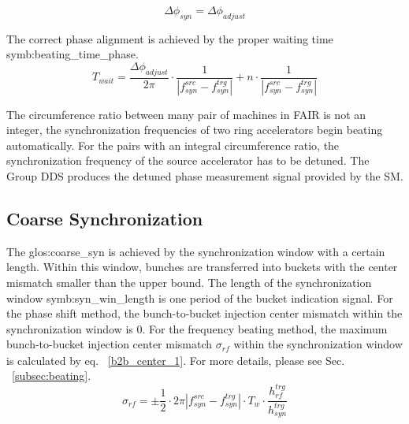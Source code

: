\begin{equation}
\Delta \phi_\mathit{syn}=\Delta \phi_\mathit{adjust} 
\end{equation}

The correct phase alignment is achieved by the proper waiting time \gls{symb:beating_time_phase}.
\begin{equation}
T_\mathit{wait}= \frac{\Delta \phi_\mathit{adjust}}{2\pi}\cdot\frac{1}{|f_{\mathit{syn}}^\mathit{src}-f_{\mathit{syn}}^\mathit{trg}|}+n\cdot \frac{1}{|f_{\mathit{syn}}^\mathit{src}-f_{\mathit{syn}}^\mathit{trg}|}
\end{equation}

The circumference ratio between many pair of machines in FAIR is not an integer, the synchronization frequencies of two ring accelerators begin beating automatically. For the pairs with an integral circumference ratio, the synchronization frequency of the source accelerator has to be detuned. The Group DDS produces the detuned phase measurement signal provided by the SM. 



\subsection{Coarse Synchronization}

The \gls{glos:coarse_syn} is achieved by the synchronization window with a certain length. Within this window, bunches are transferred into buckets with the center mismatch smaller than the upper bound. The length of the synchronization window \gls{symb:syn_win_length} is one period of the bucket indication signal. For the phase shift method, the bunch-to-bucket injection center mismatch within the synchronization window is $0$. For the frequency beating method, the maximum bunch-to-bucket injection center mismatch $\sigma_\mathit{rf}$ within the synchronization window is calculated by eq. ~\ref{b2b_center_1}. For more details, please see Sec. ~\ref{subsec:beating}.
\begin{equation}
\sigma_\mathit{rf}=\pm \frac{1}{2}\cdot 2\pi|f_{\mathit{syn}}^\mathit{src}-f_{\mathit{syn}}^\mathit{trg}|\cdot T_\mathit{w} \cdot \frac{h_{\mathit{rf}}^\mathit{trg}}{h_{\mathit{syn}}^\mathit{trg}}
\label{b2b_center_1}
\end{equation}


